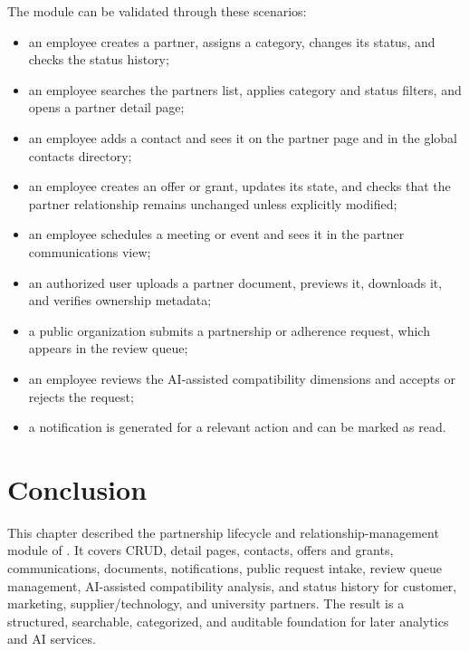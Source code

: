 The module can be validated through these scenarios:
\begin{itemize}
  \item an employee creates a partner, assigns a category, changes its status, and checks the status history;
  \item an employee searches the partners list, applies category and status filters, and opens a partner detail page;
  \item an employee adds a contact and sees it on the partner page and in the global contacts directory;
  \item an employee creates an offer or grant, updates its state, and checks that the partner relationship remains unchanged unless explicitly modified;
  \item an employee schedules a meeting or event and sees it in the partner communications view;
  \item an authorized user uploads a partner document, previews it, downloads it, and verifies ownership metadata;
  \item a public organization submits a partnership or adherence request, which appears in the review queue;
  \item an employee reviews the AI-assisted compatibility dimensions and accepts or rejects the request;
  \item a notification is generated for a relevant action and can be marked as read.
\end{itemize}

\section{Conclusion}

This chapter described the partnership lifecycle and relationship-management module of \projectname{}. It covers CRUD, detail pages, contacts, offers and grants, communications, documents, notifications, public request intake, review queue management, AI-assisted compatibility analysis, and status history for customer, marketing, supplier/technology, and university partners. The result is a structured, searchable, categorized, and auditable foundation for later analytics and AI services.
